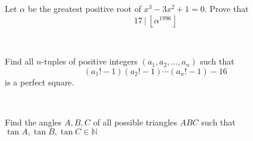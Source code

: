 \begin{problem}
    Let $\alpha$ be the greatest positive root of $x^3 - 3x^2 + 1 = 0$. Prove that $$ 17 \ | \ \left\lfloor \alpha^{1996} \right\rfloor$$ 
\end{problem}

\ 

\begin{problem}
    Find all $n$-tuples of positive integers $(a_1, a_2, \dots, a_n)$ such that $$ (a_1!-1)(a_2!-1) \cdots (a_n!-1) - 16$$ is a perfect square. 
\end{problem}

\

\begin{problem}
    Find the angles $A,B,C$ of all possible triangles $ABC$ such that $\tan{A}, \tan{B}, \tan{C} \in \mathbb{N}$
\end{problem}

